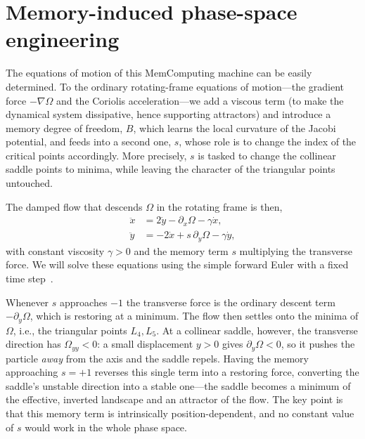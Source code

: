 \documentclass[aip,preprint,amsmath,amssymb,floatfix]{revtex4-2}
\begin{document}
\section{Memory-induced phase-space engineering}\label{sec:inversion}

The equations of motion of this MemComputing machine can be easily determined. To the ordinary rotating-frame equations of motion---the gradient force $-\nabla\Omega$ and the Coriolis
acceleration---we add a viscous term (to make the dynamical system dissipative, hence supporting attractors) and introduce a memory degree of freedom, $B$, which learns the local 
curvature of the Jacobi potential, and feeds into a second one, $s$, whose role is to change the index of the critical points accordingly. More precisely, $s$ 
is tasked to change the collinear saddle points to minima, while leaving the character of the triangular points untouched. 

The damped flow that descends $\Omega$ in the rotating frame is then, 
\begin{subequations}\label{eq:flow}
\begin{align}
  \ddot x &= 2\dot y-\partial_x\Omega-\gamma\dot x,\\
  \ddot y &= -2\dot x+s\,\partial_y\Omega-\gamma\dot y,
\end{align}
\end{subequations}
with constant viscosity $\gamma>0$ and the memory term $s$ multiplying the
transverse force. We will solve these equations using the simple forward Euler with a fixed time step~\cite{sauer2018numerical}.

Whenever $s$ approaches $-1$ the transverse force is the ordinary descent term
$-\partial_y\Omega$, which is restoring at a minimum. The flow then settles onto the
minima of $\Omega$, i.e., the triangular points $L_4,L_5$. At a collinear saddle,
however, the transverse direction has $\Omega_{yy}<0$: a small displacement $y>0$
gives $\partial_y\Omega<0$, so it pushes the particle
\emph{away} from the axis and the saddle repels. Having the memory approaching $s=+1$ reverses this single
term into a restoring force, converting the saddle's unstable direction into a
stable one---the saddle becomes a minimum of the effective, inverted landscape and
an attractor of the flow. The key point is that this memory term is intrinsically position-dependent, and no constant value of $s$ would work 
in the whole phase space. 
\end{document}
